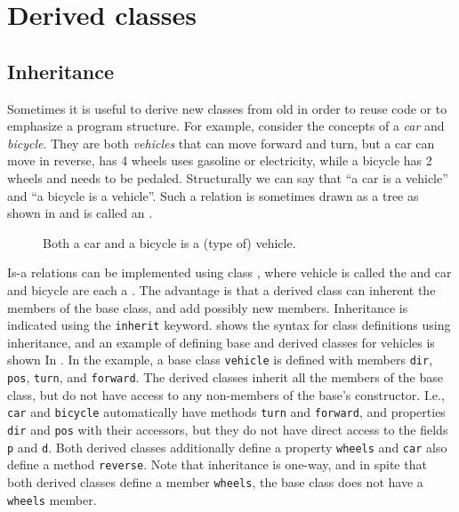 \chapter{Derived classes}
\label{chap:derivedClasses}
\section{Inheritance}
\label{sec:inheritance}
Sometimes it is useful to derive new classes from old in order to reuse code or to emphasize a program structure. For example, consider the concepts of a \emph{car} and \emph{bicycle}. They are both \emph{vehicles} that can move forward and turn, but a car can move in reverse, has 4 wheels uses gasoline or electricity, while a bicycle has 2 wheels and needs to be pedaled. Structurally we can say that ``a car is a vehicle'' and ``a bicycle is a vehicle''. Such a relation is sometimes drawn as a tree as shown in  and is called an .
%
\begin{figure}
  \centering
  \caption{Both a car and a bicycle is a (type of) vehicle.}
  \label{fig:inheritanceVehicle}
\end{figure}
%
Is-a relations can be implemented using class , where vehicle is called the  and car and bicycle are each a . The advantage is that a derived class can inherent the members of the base class,  and add possibly new members. Inheritance is indicated using the \lstinline[language=syntax]{inherit} keyword.  shows the syntax for class definitions using inheritance, and an example of defining base and derived classes for vehicles is shown In .
%
%
In the example, a base class \lstinline{vehicle} is defined with members \lstinline{dir}, \lstinline{pos}, \lstinline{turn}, and \lstinline{forward}. The derived classes inherit all the members of the base class, but do not have access to any non-members of the base's constructor. I.e., \lstinline{car} and \lstinline{bicycle} automatically have methods \lstinline{turn} and \lstinline{forward}, and properties \lstinline{dir} and \lstinline{pos} with their accessors, but they do not have direct access to the fields \lstinline{p} and \lstinline{d}. Both derived classes additionally define a property \lstinline{wheels} and \lstinline{car} also define a method \lstinline{reverse}. Note that inheritance is one-way, and in spite that both derived classes define a member \lstinline{wheels}, the base class does not have a \lstinline{wheels} member.

